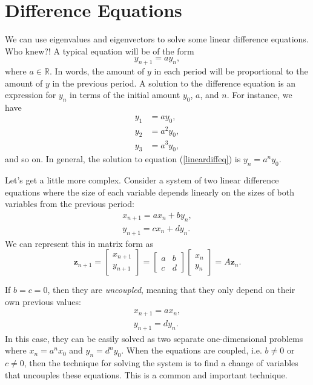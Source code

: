 \documentclass[12pt]{article}
\newcommand{\R}{\mathbb{R}}
\renewcommand{\vec}[1]{\mathbf{#1}}
\theoremstyle{definition}
\begin{document}
\section{Difference Equations} 
We can use eigenvalues and eigenvectors to solve some linear difference equations. Who knew?! A typical equation will be of the form
\begin{equation}	y_{n+1} = a y_n,	\label{lineardiffeq}\end{equation}
where $a \in \R$. In words, the amount of $y$ in each period will be proportional to the amount of $y$ in the previous period. A solution to the difference equation is an expression for $y_n$ in terms of the initial amount $y_0$, $a$, and $n$. For instance, we have
\begin{align*}
	y_1 &= ay_0,\\
	y_2 &= a^2y_0,\\
	y_3 &= a^3y_0,
\end{align*}
and so on. In general, the solution to equation (\ref{lineardiffeq}) is $y_n = a^ny_0$. 

Let's get a little more complex. Consider a system of two linear difference equations where the size of each variable depends linearly on the sizes of both variables from the previous period:
\begin{align*}
	x_{n+1} = ax_n + by_n,\\
	y_{n+1} = cx_n + dy_n.
\end{align*}
We can represent this in matrix form as
\[\vec{z}_{n+1} = \begin{bmatrix} x_{n+1} \\ y_{n+1}\end{bmatrix} = 
	\begin{bmatrix} a & b \\ c & d \end{bmatrix}\begin{bmatrix} x_n \\ y_n \end{bmatrix} = A\vec{z}_n.	\]
	
	If $b=c=0$, then they are \emph{uncoupled}, meaning that they only depend on their own previous values:
\begin{align*}
	x_{n+1} = ax_n,\\
	y_{n+1} = dy_n.
\end{align*}
In this case, they can be easily solved as two separate one-dimensional problems where $x_n=a^n x_0$ and $y_n=d^n y_0$. When the equations are coupled, i.e. $b \neq 0$ or $c \neq 0$, then the technique for solving the system is to find a change of variables that uncouples these equations. This is a common and important technique. 
\end{document}
